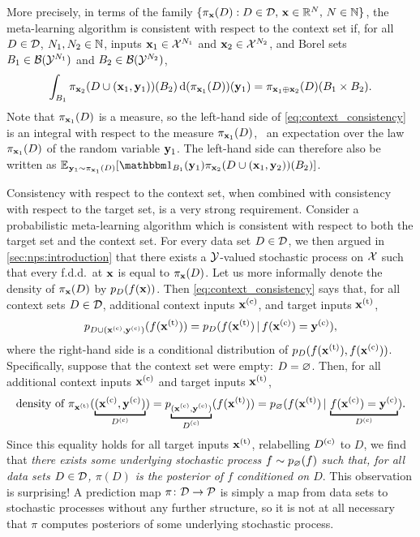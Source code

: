 \documentclass[12pt, twoside]{report}
\begin{document}
More precisely, in terms of the family $\set{\pi_\vx(D) : D \in \D, \,\vx \in \R^N,\, N \in \N}$, the meta-learning algorithm is consistent with respect to the context set if,
for all $D \in \D$,
$N_1, N_2 \in \N$,
inputs $\vx_1 \in \X^{N_1}$ and
$\vx_2 \in \X^{N_2}$, and
Borel sets $B_1 \in \B(\Y^{N_1})$ and
 $B_2 \in \B(\Y^{N_2})$,%
\begin{equation} \label{eq:context_consistency}
    \int_{B_1} \pi_{\vx_2}(D \cup (\vx_1, \vy_1))(B_2) \isd(\pi_{\vx_1}(D))(\vy_1)
    = \pi_{\vx_1 \oplus \vx_2}(D)(B_1 \times B_2).
\end{equation}
Note that $\pi_{\vx_1}(D)$ is a measure, so the left-hand side of \eqref{eq:context_consistency} is an integral with respect to the measure $\pi_{\vx_1}(D)$, \ie~an expectation over the law $\pi_{\vx_1}(D)$ of the random variable $\vy_1$.
The left-hand side can therefore also be written as
$\E_{\hspace{0.5pt}\vy_1 \sim \pi_{\vx_1}(D)}[\ind_{B_1}(\vy_1) \pi_{\vx_2}(D \cup (\vx_1, \vy_2))(B_2)]$.

\pagebreak
Consistency with respect to the context set, when combined with consistency with respect to the target set, is a very strong requirement.
Consider a probabilistic meta-learning algorithm which is consistent with respect to both the target set and the context set.
For every data set $D \in \D$, we then argued in \cref{sec:nps:introduction} that there exists a $\Y$-valued stochastic process on $\X$ such that every f.d.d.\ at $\vx$ is equal to $\pi_\vx(D)$.
Let us more informally denote the density of $\pi_\vx(D)$ by $p_D(f(\vx))$.
Then \eqref{eq:context_consistency} says that, for all context sets $D \in \D$, additional context inputs $\vx\us{(c)}$, and target inputs $\vx\us{(t)}$,
\begin{equation}
    p_{D \cup (\vx\us{(c)}, \vy\us{(c)})}(f(\vx\us{(t)}))
    = p_D(f(\vx\us{(t)}) \cond f(\vx\us{(c)}) = \vy\us{(c)}),
\end{equation}
where the right-hand side is a conditional distribution of $p_D(f(\vx\us{(t)}), f(\vx\us{(c)}))$.
Specifically, suppose that the context set were empty: $D = \es$.
Then, for all additional context inputs $\vx\us{(c)}$ and target inputs $\vx\us{(t)}$,
\begin{equation}
    \text{density of $\pi_{\vx\us{(t)}}(
        \underbracket[1pt]{(\vx\us{(c)}, \vy\us{(c)})}_{D\us{(c)}}
    )$}
    = p_{
        \underbracket[1pt]{\scriptstyle(\vx\us{(c)}, \vy\us{(c)})}_{\scriptstyle D\us{(c)}}
    }(f(\vx\us{(t)}))
    = p_{\es}(f(\vx\us{(t)}) \cond
        \underbracket[1pt]{f(\vx\us{(c)}) = \vy\us{(c)}}_{D\us{(c)}}
    ).
\end{equation}
Since this equality holds for all target inputs $\vx\us{(t)}$, relabelling $D\us{(c)}$ to $D$, we find that \emph{there exists some underlying stochastic process $f \sim p_\es(f)$ such that, for all data sets $D \in \D$, $\pi(D)$ is the posterior of $f$ conditioned on $D$}.
This observation is surprising!
A prediction map $\pi \colon \D \to \Pc$ is simply a map from data sets to stochastic processes without any further structure,
so it is not at all necessary that $\pi$ computes posteriors of some underlying stochastic process.
\end{document}
